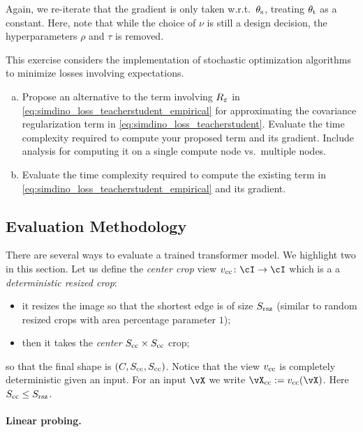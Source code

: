 \documentclass[../../book-main.tex]{subfiles}
\begin{document}
Again, we re-iterate that the gradient is only taken w.r.t.~\(\theta_{\mathrm{s}}\), treating \(\theta_{\mathrm{t}}\) as a constant. Here, note that while the choice of \(\nu\) is still a design decision, the hyperparameters \(\rho\) and \(\tau\) is removed.

\begin{exercise}
    This exercise considers the implementation of stochastic optimization algorithms to minimize losses involving expectations.
    \begin{enumerate}[(a)]
        \item Propose an alternative to the term involving \(R_{\varepsilon}\) in \eqref{eq:simdino_loss_teacherstudent_empirical} for approximating the covariance regularization term in \eqref{eq:simdino_loss_teacherstudent}. Evaluate the time complexity required to compute your proposed term and its gradient. Include analysis for computing it on a single compute node vs.~multiple nodes.
        \item  Evaluate the time complexity required to compute the existing term in \eqref{eq:simdino_loss_teacherstudent_empirical} and its gradient.
    \end{enumerate}
\end{exercise}


\subsection{Evaluation Methodology}\label{sub:contrastive_learning_evals}
There are several ways to evaluate a trained transformer model. We highlight two in this section. Let us define the \textit{center crop} view \(v_{\cc} \colon \cI \to \cI\) which is a a \textit{deterministic resized crop}:
\begin{itemize}
    \item it resizes the image so that the shortest edge is of size \(S_{\mathrm{rsz}}\) (similar to random resized crops with area percentage parameter \(1\));
    \item then it takes the \textit{center} \(S_{\mathrm{cc}} \times S_{\mathrm{cc}}\) crop;
\end{itemize}
so that the final shape is \((C, S_{\mathrm{cc}}, S_{\mathrm{cc}})\). Notice that the view \(v_{\mathrm{cc}}\) is completely deterministic given an input. For an input \(\vX\) we write \(\vX_{\cc} := v_{\cc}(\vX)\). Here \(S_{\mathrm{cc}} \leq S_{\mathrm{rsz}}\).


\paragraph{Linear probing.}
\end{document}
